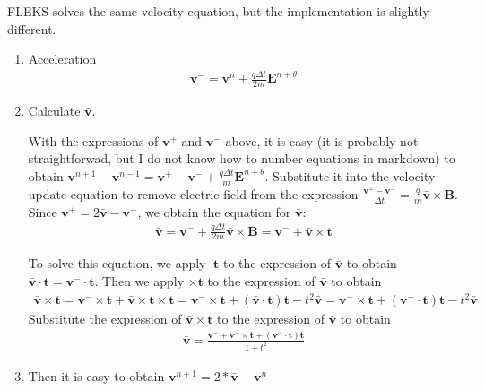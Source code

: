 \documentclass[a4paper, 11pt]{article}
\begin{document}
FLEKS solves the same velocity equation, but the implementation is slightly different.
\begin{enumerate}
    \item Acceleration 
\begin{eqnarray}
    \mathbf{v}^- = \mathbf{v}^{n} + \frac{q\Delta t}{2m}\mathbf{E}^{n+\theta}
\end{eqnarray}

\item Calculate $\bar{\mathbf{v}}$. 

With the expressions of $\mathbf{v}^+$ and $\mathbf{v}^-$ above, it is easy (it is probably not straightforwad, but I do not know how to number equations in markdown) to obtain $\mathbf{v}^{n+1} - \mathbf{v}^{n-1} = \mathbf{v}^+ - \mathbf{v}^- + \frac{q\Delta t}{m} \mathbf{E}^{n+\theta}$. Substitute it into the velocity update equation to remove electric field from the expression $\frac{\mathbf{v}^{+} - \mathbf{v}^{-}}{\Delta t} = \frac{q}{m}\bar{\mathbf{v}}\times\mathbf{B}$. Since $\mathbf{v}^+ = 2\bar{\mathbf{v}} - \mathbf{v}^-$, we obtain the equation for $\bar{\mathbf{v}}$:
\begin{eqnarray}
  \bar{\mathbf{v}} = \mathbf{v}^- + \frac{q\Delta t}{2m} \bar{\mathbf{v}} \times \mathbf{B} = \mathbf{v}^- + \bar{\mathbf{v}} \times \mathbf{t}   
\end{eqnarray}

To solve this equation, we apply $\cdot \mathbf{t}$ to the expression of $\bar{\mathbf{v}}$ to obtain $\bar{\mathbf{v}} \cdot \mathbf{t} = \mathbf{v}^- \cdot \mathbf{t}$. Then we apply $\times \mathbf{t}$ to the expression of $\bar{\mathbf{v}}$ to obtain
\begin{eqnarray}
\bar{\mathbf{v}} \times \mathbf{t} = \mathbf{v}^- \times \mathbf{t} + \bar{\mathbf{v}} \times \mathbf{t} \times \mathbf{t} = \mathbf{v}^- \times \mathbf{t} + (\bar{\mathbf{v}} \cdot \mathbf{t})\mathbf{t} - t^2\bar{\mathbf{v}} = \mathbf{v}^- \times \mathbf{t} + (\mathbf{v}^- \cdot \mathbf{t})\mathbf{t} - t^2\bar{\mathbf{v}}
\end{eqnarray}
Substitute the expression of $\bar{\mathbf{v}} \times \mathbf{t}$ to the expression of $\bar{\mathbf{v}}$ to obtain 
\begin{eqnarray}
\bar{\mathbf{v}} = \frac{\mathbf{v}^- + \mathbf{v}^- \times \mathbf{t} + (\mathbf{v}^- \cdot \mathbf{t})\mathbf{t}}{1+t^2}
\end{eqnarray}

\item Then it is easy to obtain $\mathbf{v}^{n+1} = 2*\bar{\mathbf{v}} - \mathbf{v}^{n}$
\end{enumerate}
\end{document}
